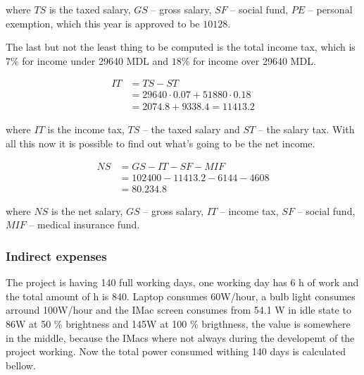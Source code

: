 \noindent
where $TS$ is the taxed salary, $GS$ -- gross salary, $SF$ -- social fund, $PE$ -- personal exemption, which this year is approved to be $10128$.

The last but not the least thing to be computed is the total income tax, which is $7\%$ for income under 29640 MDL and $18\%$ for income over 29640 MDL.

\begin{equation}
\begin{split}
 IT &= TS - ST \\
      &= 29640 \cdot 0.07 + 51880 \cdot 0.18 \\
      & = 2074.8 + 9338.4 = 11413.2
 \end{split}
\end{equation}

\noindent
where $IT$ is the income tax, $TS$ -- the taxed salary and $ST$ -- the salary tax. With all this now it is possible to find out what's going to be the net income.

\begin{equation}
\begin{split}
 NS &= GS - IT - SF - MIF \\
            &= 102400 - 11413.2 - 6144 - 4608 \\
            &= 80.234.8
\end{split}
\end{equation}

\noindent
where $NS$ is the net salary, $GS$ -- gross salary, $IT$ -- income tax, $SF$ -- social fund, $MIF$ -- medical insurance fund.

\subsubsection{Indirect expenses}

The project is having 140 full working days, one working day has 6 h of work and the total amount of h is 840.
Laptop consumes 60W/hour, a bulb light consumes arround 100W/hour and the IMac screen consumes from 54.1 W in idle state to 86W at 50 \% brightness and 145W at 100 \% brigthness, the value is somewhere in the middle, because the IMacs where not always during the developemt of the project working. Now the total power consumed withing 140 days is calculated bellow.

